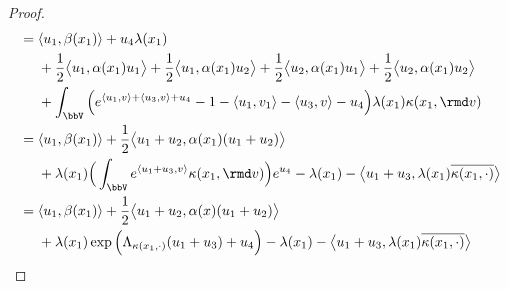 \begin{proof}
\begin{align*}
    &= \begin{aligned}[t]
      &\prj{\momentVar_1}{\affDrift(\stateVar_1)} + \momentVar_4\affInt(\stateVar_1) \\
      &+ \frac12\bprj{\momentVar_1}{\affDiff(\stateVar_1)\momentVar_1}  + \frac12\bprj{\momentVar_1}{\affDiff(\stateVar_1)\momentVar_2}  + \frac12\bprj{\momentVar_2}{\affDiff(\stateVar_1)\momentVar_1}+ \frac12\bprj{\momentVar_2}{\affDiff(\stateVar_1)\momentVar_2}\\
      &+ \int_\vecSpace \Big( e^{\prj{\momentVar_1}{\markVar} + \prj{\momentVar_3}{\markVar} + \momentVar_4} - 1 - \prj{\momentVar_1}{\markVar_1} - \prj{\momentVar_3}{\markVar} - \momentVar_4  \Big) \affInt(\stateVar_1) \affDist(\stateVar_1, \rmd\markVar)
    \end{aligned} \\
    &= \begin{aligned}[t]
      &\prj{\momentVar_1}{\affDrift(\stateVar_1)} + \frac12\bprj{\momentVar_1+\momentVar_2}{\affDiff(\stateVar_1)(\momentVar_1+\momentVar_2)}  \\
      &+ \affInt(\stateVar_1)\Big(\int_\vecSpace e^\prj{\momentVar_1+\momentVar_3}{\markVar} \affDist(\stateVar_1, \rmd\markVar) \Big) e^{\momentVar_4} - \affInt(\stateVar_1) - \bprj{\momentVar_1 + \momentVar_3}{\affInt(\stateVar_1)\overline{\affDist(\stateVar_1,\cdot)}}
    \end{aligned} \\
    &= \begin{aligned}[t]
      &\prj{\momentVar_1}{\affDrift(\stateVar_1)} + \frac12\bprj{\momentVar_1+\momentVar_2}{\affDiff(\stateVar)(\momentVar_1+\momentVar_2)} \\
      &+ \affInt(\stateVar_1)\exp\Big(\ode_{\affDist(\stateVar_1,\cdot)}(\momentVar_1+\momentVar_3) + \momentVar_4\Big) - \affInt(\stateVar_1) -  \bprj{\momentVar_1+\momentVar_3}{\affInt(\stateVar_1)\overline{\affDist(\stateVar_1,\cdot)}} 
    \end{aligned}
  \end{align*}
\end{proof}
